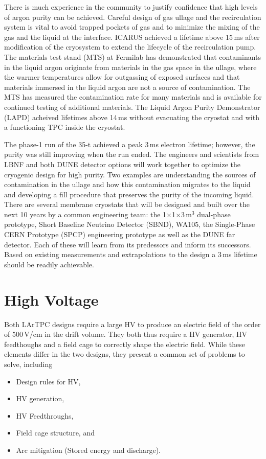 There is much experience in the community to justify confidence that
high levels of argon purity can be achieved.  Careful design of gas
ullage and the recirculation system is vital to avoid trapped pockets
of gas and to minimize the mixing of the gas and the liquid at the
interface.  ICARUS achieved a lifetime above 15\,ms after modification of
the cryosystem to extend the lifecycle of the recirculation
pump.\cite{Antonello:2014eha} The materials test stand (MTS) at Fermilab has
demonstrated that contaminants in the liquid argon originate from
materials in the gas space in the ullage, where the warmer
temperatures allow for outgassing of exposed surfaces and that
materials immersed in the liquid argon are not a source of
contamination.\cite{andrewsNIM} The MTS has measured the
contamination rate for many materials and is available for
continued testing of additional materials.  The Liquid Argon Purity
Demonstrator (LAPD) acheived lifetimes above 14\,ms without evacuating
the cryostat and with a functioning TPC inside the
cryostat.\cite{Bromberg:2015uia}

The phase-1 run of the 35-t achieved a peak 3\,ms electron lifetime;
however, the purity was still improving when the run ended.  The
engineers and scientists from LBNF and both DUNE detector options will
work together to optimize the cryogenic design for high purity. Two
examples are understanding the sources of contamination in the ullage
and how this contamination migrates to the liquid and developing a
fill procedure that preserves the purity of the incoming liquid.
There are several membrane cryostats that will be designed and built
over the next 10 years by a common engineering team: the
1$\times$1$\times$3\,m$^3$ dual-phase prototype, Short Baseline
Neutrino Detector (SBND), WA105, the Single-Phase CERN Prototype
(SPCP) engineering prototype as well as the DUNE far detector. Each of
these will learn from its predessors and inform its successors. Based
on existing measurements and extrapolations to the  design a 3\,ms
lifetime should be readily achievable.


\section{High Voltage}

Both LArTPC designs require a large HV to
produce an electric field of the order of 500\,V/cm in the drift
volume.  They both thus require a HV generator, HV
feedthoughs and a field cage to correctly shape the electric
field. While these elements differ in the two designs, they present a common
set of problems to solve, including
\begin{itemize}
\item Design rules for HV,
\item HV generation,
\item HV Feedthroughs,
\item Field cage structure, and
\item Arc mitigation (Stored energy and discharge).
\end{itemize}


